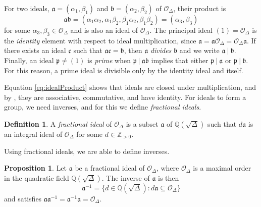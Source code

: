 \documentclass{ucalgthes1}
\theoremstyle{definition}
\newtheorem{prop}[thm]{Proposition}
\newtheorem{defn}[thm]{Definition}
\newcommand{\QQ}{\mathbb{Q}}
\newcommand{\ZZgtz}{\mathbb{Z}_{>0}}
\newcommand{\OO}{\mathcal{O}}
\newcommand{\ideal}{\mathfrak}
\begin{document}
For two ideals, $\ideal a = (\alpha_1, \beta_1)$ and $\ideal b = (\alpha_2, \beta_2)$ of $\OO_\Delta$, their product is
\begin{equation}
	\ideal a \ideal b = (\alpha_1 \alpha_2, \alpha_1 \beta_2, \beta_1 \alpha_2, \beta_1 \beta_2) = (\alpha_3, \beta_3) \label{eq:idealProduct}
\end{equation}
for some $\alpha_3, \beta_3 \in \OO_\Delta$ and is also an ideal of $\OO_\Delta$. The principal ideal $(1) = \OO_\Delta$ is the \emph{identity} element with respect to ideal multiplication, since $\ideal a = \ideal a \OO_\Delta = \OO_\Delta \ideal a$.  If there exists an ideal $\ideal c$ such that $\ideal a \ideal c = \ideal b$, then $\ideal a$ \emph{divides} $\ideal b$ and we write $\ideal a ~|~ \ideal b$.  Finally, an ideal $\ideal p \neq (1)$ is \emph{prime} when $\ideal p ~|~ \ideal a \ideal b$ implies that either $\ideal p ~|~ \ideal a$ or $\ideal p ~|~ \ideal b$.  For this reason, a prime ideal is divisible only by the identity ideal and itself.

Equation \ref{eq:idealProduct} shows that ideals are closed under multiplication, and by \cite[p.117]{Cohn1980}, they are associative, commutative, and have identity.  For ideals to form a group, we need inverses, and for this we define \emph{fractional ideals}.

\begin{defn}
\cite[\S 2.1]{Jacobson2009} A \emph{fractional ideal} of $\OO_\Delta$ is a subset $\ideal a$ of $\QQ(\sqrt \Delta)$ such that $d \ideal a$ is an integral ideal of $\OO_\Delta$ for some $d \in \ZZgtz$.
\end{defn}

Using fractional ideals, we are able to define inverses.

\begin{prop}
\cite[Proposition 2.14]{Ramachandran2006} Let $\ideal a$ be a fractional ideal of $\OO_\Delta$, where $\OO_\Delta$ is a maximal order in the quadratic field $\QQ(\sqrt \Delta)$.  The inverse of $\ideal a$ is then
\[
	\ideal a^{-1} = \{ d \in \QQ(\sqrt \Delta) : d \ideal a \subseteq \OO_\Delta \}
\]
and satisfies $\ideal a \ideal a^{-1} = \ideal a^{-1} \ideal a = \OO_\Delta$.
\end{prop}
\end{document}

